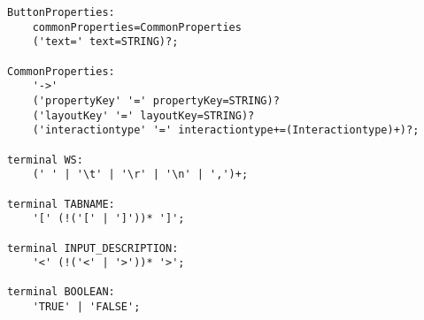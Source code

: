 \begin{lstlisting}[caption = Grammatik der 3. Iteration]
ButtonProperties:
	commonProperties=CommonProperties
	('text=' text=STRING)?;

CommonProperties:
	'->'
	('propertyKey' '=' propertyKey=STRING)?
	('layoutKey' '=' layoutKey=STRING)?
	('interactiontype' '=' interactiontype+=(Interactiontype)+)?;

terminal WS:
	(' ' | '\t' | '\r' | '\n' | ',')+;

terminal TABNAME:
	'[' (!('[' | ']'))* ']';

terminal INPUT_DESCRIPTION:
	'<' (!('<' | '>'))* '>';

terminal BOOLEAN:
	'TRUE' | 'FALSE';
\end{lstlisting}